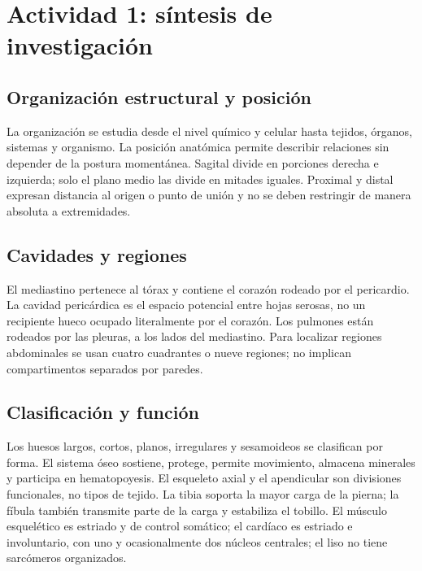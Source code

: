 \def\uadectitulo{Anatomía humana}


\portadaUAdeC
\section{Actividad 1: síntesis de investigación}
\subsection{Organización estructural y posición}
La organización se estudia desde el nivel químico y celular hasta tejidos, órganos, sistemas y organismo. La posición anatómica permite describir relaciones sin depender de la postura momentánea. Sagital divide en porciones derecha e izquierda; solo el plano medio las divide en mitades iguales. Proximal y distal expresan distancia al origen o punto de unión y no se deben restringir de manera absoluta a extremidades.
\subsection{Cavidades y regiones}
El mediastino pertenece al tórax y contiene el corazón rodeado por el pericardio. La cavidad pericárdica es el espacio potencial entre hojas serosas, no un recipiente hueco ocupado literalmente por el corazón. Los pulmones están rodeados por las pleuras, a los lados del mediastino. Para localizar regiones abdominales se usan cuatro cuadrantes o nueve regiones; no implican compartimentos separados por paredes.
\subsection{Clasificación y función}
Los huesos largos, cortos, planos, irregulares y sesamoideos se clasifican por forma. El sistema óseo sostiene, protege, permite movimiento, almacena minerales y participa en hematopoyesis. El esqueleto axial y el apendicular son divisiones funcionales, no tipos de tejido. La tibia soporta la mayor carga de la pierna; la fíbula también transmite parte de la carga y estabiliza el tobillo. El músculo esquelético es estriado y de control somático; el cardíaco es estriado e involuntario, con uno y ocasionalmente dos núcleos centrales; el liso no tiene sarcómeros organizados.
